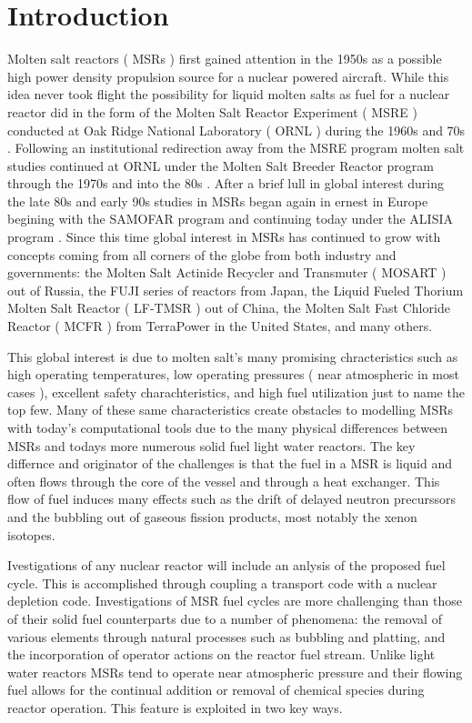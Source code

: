 \chapter{Introduction}\label{ch:intro}

Molten salt reactors ( MSRs ) first gained attention in the 1950s as a possible
high power density propulsion source for a nuclear powered aircraft. While this
idea never took flight the possibility for liquid molten salts as fuel for a
nuclear reactor did in the form of the Molten Salt Reactor Experiment ( MSRE )
conducted at Oak Ridge National Laboratory ( ORNL ) during the 1960s and 70s 
\cite{ORNL-MSRE}. Following an institutional redirection away from the MSRE
program molten salt studies continued at ORNL under the Molten Salt Breeder
Reactor program through the 1970s and into the 80s \cite{ORNL-MSBR}. After a
brief lull in global interest during the late 80s and early 90s studies in MSRs
began again in ernest in Europe begining with the SAMOFAR program and continuing
today under the ALISIA program \cite{SAMOFAR}. Since this time global interest
in MSRs has continued to grow with concepts coming from all corners of the
globe from both industry and governments: the Molten Salt Actinide Recycler and
Transmuter ( MOSART ) out of Russia, the FUJI series of reactors from Japan, 
the Liquid Fueled Thorium Molten Salt Reactor ( LF-TMSR ) out of China, the
Molten Salt Fast Chloride Reactor ( MCFR ) from TerraPower in the United States,
and many others.

This global interest is due to molten salt's many promising chracteristics such
as high operating temperatures, low operating pressures ( near atmospheric in
most cases ), excellent safety charachteristics, and high fuel utilization just
to name the top few. Many of these same characteristics create obstacles to 
modelling MSRs with today's computational tools due to the many physical
differences between MSRs and todays more numerous solid fuel light water
reactors. The key differnce and originator of the challenges is that the fuel
in a MSR is liquid and often flows through the core of the vessel and through
a heat exchanger. This flow of fuel induces many effects such as the drift of
delayed neutron precurssors and the bubbling out of gaseous fission products,
most notably the xenon isotopes.

Ivestigations of any nuclear reactor will include an anlysis of the proposed
fuel cycle. This is accomplished through coupling a transport code with a
nuclear depletion code. Investigations of MSR fuel cycles are more challenging
than those of their solid fuel counterparts due to a number of phenomena: the
removal of various elements through natural processes such as bubbling and
platting, and the incorporation of operator actions on the reactor fuel stream.
Unlike light water reactors MSRs tend to operate near atmospheric pressure and
their flowing fuel allows for the continual addition or removal of chemical
species during reactor operation. This feature is exploited in two key ways.

